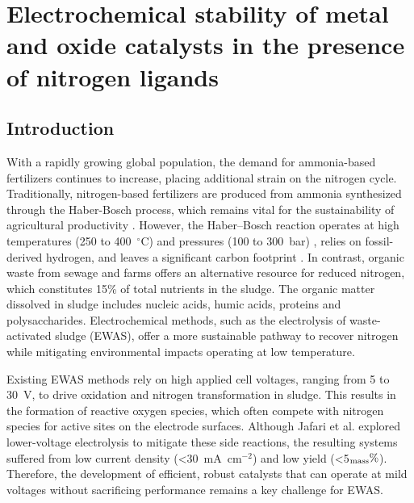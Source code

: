 
\chapter{Electrochemical stability of metal and oxide catalysts in the presence of nitrogen ligands}

\section{Introduction}
With a rapidly growing global population, the demand for ammonia-based fertilizers continues to increase, placing additional strain on the nitrogen cycle. Traditionally, nitrogen-based fertilizers are produced from ammonia synthesized through the Haber-Bosch process, which remains vital for the sustainability of agricultural productivity \cite{Schloegl2003CatalyticStory}. However, the Haber–Bosch reaction operates at high temperatures (250 to 400~$^\circ$C) and pressures (100 to 300~bar) \cite{Smil1999DetonatorExplosion,Erisman2008HowWorld, Lim2021Ammonia2050,Verleysen2021HowStorage}, relies on fossil-derived hydrogen, and leaves a significant carbon footprint \cite{Liu2022ProspectsFixation, Smil1999DetonatorExplosion,Suryanto2021NitrogenShuttle}. In contrast, organic waste from sewage and farms offers an alternative resource for reduced nitrogen\cite{ChipocoHaro2024ElectrocatalystsConversion,Adebayo2004EvaluationFingerlings,Mulchandani2016RecoverySludges}, which constitutes 15\% of total nutrients in the sludge\cite{Xiao2020ProteinReview, Thomsen2017ChangesSludge}. The organic matter dissolved in sludge includes nucleic acids, humic acids, proteins and polysaccharides\cite{Jung2002RecoverabilityWastewater}. Electrochemical methods, such as the electrolysis of waste-activated sludge (EWAS), offer a more sustainable pathway to recover nitrogen while mitigating environmental impacts operating at low temperature\cite{Botte2024InnovativeRecovery,Vedharathinam2014ExperimentalMedium,Alvarez-Pugliese2024PerspectivesWaste, Zeng2019ElectrochemicalSulfide,Ye2016ElectrochemicalProduction}. 

Existing EWAS methods rely on high applied cell voltages, ranging from 5 to 30~V, to drive oxidation and nitrogen transformation in sludge. This results in the formation of reactive oxygen species, which often compete with nitrogen species for active sites on the electrode surfaces. Although Jafari et al.\cite{JafariElectrochemicalProduction} explored lower-voltage electrolysis to mitigate these side reactions, the resulting systems suffered from low current density (<30~mA~cm$^{-2}$) and low yield (<5$_{\rm mass}\%$)\cite{Zhao2022AAmmonia}. Therefore, the development of efficient, robust catalysts that can operate at mild voltages without sacrificing performance remains a key challenge for EWAS.

